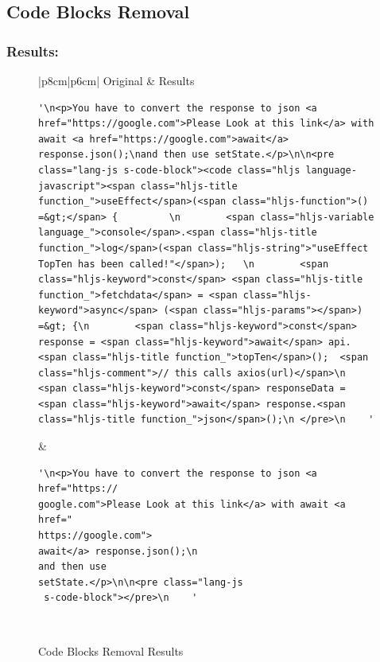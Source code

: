 \subsection{Code Blocks Removal } \label{code-blocks-removal_results}
\subsubsection{Results:} \label{code-blocks-removal_results_results}
\newpage
\begin{figure}[H]
  \begin{center}
    \begin{tabular}{|p{8cm}|p{6cm}|}
    \hline\hline
    Original & Results \\ [0.5ex] %
    \hline 
    \begin{lstlisting}[frame=none]
'\n<p>You have to convert the response to json <a href="https://google.com">Please Look at this link</a> with await <a href="https://google.com">await</a> response.json();\nand then use setState.</p>\n\n<pre class="lang-js s-code-block"><code class="hljs language-javascript"><span class="hljs-title function_">useEffect</span>(<span class="hljs-function">() =&gt;</span> {         \n        <span class="hljs-variable language_">console</span>.<span class="hljs-title function_">log</span>(<span class="hljs-string">"useEffect TopTen has been called!"</span>);   \n        <span class="hljs-keyword">const</span> <span class="hljs-title function_">fetchdata</span> = <span class="hljs-keyword">async</span> (<span class="hljs-params"></span>) =&gt; {\n        <span class="hljs-keyword">const</span> response = <span class="hljs-keyword">await</span> api.<span class="hljs-title function_">topTen</span>();  <span class="hljs-comment">// this calls axios(url)</span>\n        <span class="hljs-keyword">const</span> responseData = <span class="hljs-keyword">await</span> response.<span class="hljs-title function_">json</span>();\n </pre>\n    '
    \end{lstlisting} &\begin{lstlisting}[frame=none]
'\n<p>You have to convert the response to json <a href="https://
google.com">Please Look at this link</a> with await <a href="
https://google.com">
await</a> response.json();\n
and then use 
setState.</p>\n\n<pre class="lang-js 
 s-code-block"></pre>\n    '
    \end{lstlisting} \\ 
    \hline 
    \end{tabular}
  \end{center}
  \caption{Code Blocks Removal Results}
  \label{fig:code-blocks-removal_results_results}
\end{figure}

